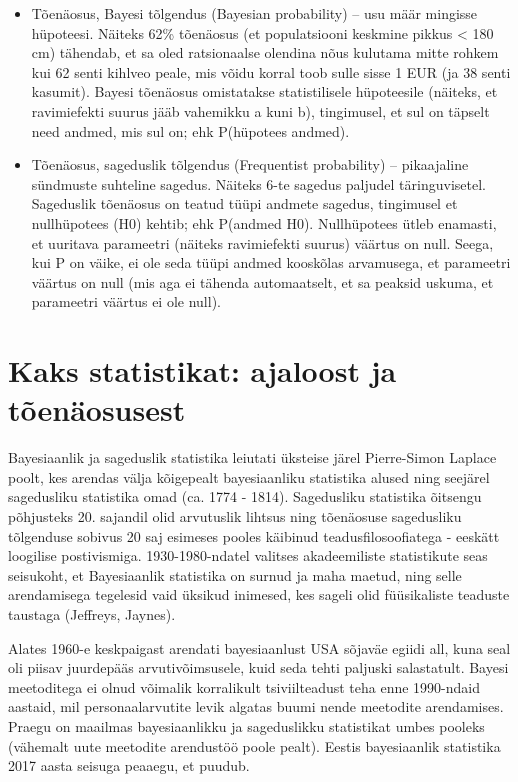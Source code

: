 \documentclass[]{book}
\begin{document}
\begin{itemize}
\item
  Tõenäosus, Bayesi tõlgendus (Bayesian probability) -- usu määr mingisse hüpoteesi. Näiteks 62\% tõenäosus (et populatsiooni keskmine pikkus \textless{} 180 cm) tähendab, et sa oled ratsionaalse olendina nõus kulutama mitte rohkem kui 62 senti kihlveo peale, mis võidu korral toob sulle sisse 1 EUR (ja 38 senti kasumit). Bayesi tõenäosus omistatakse statistilisele hüpoteesile (näiteks, et ravimiefekti suurus jääb vahemikku a kuni b), tingimusel, et sul on täpselt need andmed, mis sul on; ehk P(hüpotees \textbar{} andmed).
\item
  Tõenäosus, sageduslik tõlgendus (Frequentist probability) -- pikaajaline sündmuste suhteline sagedus. Näiteks 6-te sagedus paljudel täringuvisetel. Sageduslik tõenäosus on teatud tüüpi andmete sagedus, tingimusel et nullhüpotees (H0) kehtib; ehk P(andmed \textbar{} H0). Nullhüpotees ütleb enamasti, et uuritava parameetri (näiteks ravimiefekti suurus) väärtus on null. Seega, kui P on väike, ei ole seda tüüpi andmed kooskõlas arvamusega, et parameetri väärtus on null (mis aga ei tähenda automaatselt, et sa peaksid uskuma, et parameetri väärtus ei ole null).
\end{itemize}

\hypertarget{kaks-statistikat-ajaloost-ja-toenaosusest-1}{%
\section*{Kaks statistikat: ajaloost ja tõenäosusest}\label{kaks-statistikat-ajaloost-ja-toenaosusest-1}}

Bayesiaanlik ja sageduslik statistika leiutati üksteise järel Pierre-Simon Laplace poolt, kes arendas välja kõigepealt bayesiaanliku statistika alused ning seejärel sagedusliku statistika omad (ca. 1774 - 1814).
Sagedusliku statistika õitsengu põhjusteks 20. sajandil olid arvutuslik lihtsus ning tõenäosuse sagedusliku tõlgenduse sobivus 20 saj esimeses pooles käibinud teadusfilosoofiatega - eeskätt loogilise postivismiga.
1930-1980-ndatel valitses akadeemiliste statistikute seas seisukoht, et Bayesiaanlik statistika on surnud ja maha maetud, ning selle arendamisega tegelesid vaid üksikud inimesed, kes sageli olid füüsikaliste teaduste taustaga (Jeffreys, Jaynes).

Alates 1960-e keskpaigast arendati bayesiaanlust USA sõjaväe egiidi all, kuna seal oli piisav juurdepääs arvutivõimsusele, kuid seda tehti paljuski salastatult.
Bayesi meetoditega ei olnud võimalik korralikult tsiviilteadust teha enne 1990-ndaid aastaid, mil personaalarvutite levik algatas buumi nende meetodite arendamises.
Praegu on maailmas bayesiaanlikku ja sageduslikku statistikat umbes pooleks (vähemalt uute meetodite arendustöö poole pealt).
Eestis bayesiaanlik statistika 2017 aasta seisuga peaaegu, et puudub.
\end{document}

